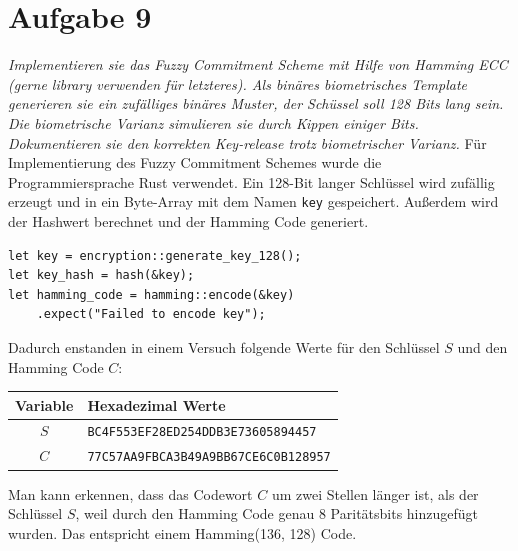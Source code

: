 \documentclass{article}
\begin{document}
    \section{Aufgabe 9}
    \textit{Implementieren sie das Fuzzy Commitment Scheme mit Hilfe von Hamming ECC
    (gerne library verwenden für letzteres). Als binäres biometrisches Template generieren 
    sie ein zufälliges binäres Muster, der Schüssel soll 128 Bits lang sein. Die
    biometrische Varianz simulieren sie durch Kippen einiger Bits. Dokumentieren sie
    den korrekten Key-release trotz biometrischer Varianz.}\vspace*{1em}\newline
    Für Implementierung des Fuzzy Commitment Schemes wurde die Programmiersprache Rust verwendet. Ein 128-Bit langer
    Schlüssel wird zufällig erzeugt und in ein Byte-Array mit dem Namen \verb|key| gespeichert. Außerdem wird 
    der Hashwert berechnet und der Hamming Code generiert.
    \begin{verbatim}
let key = encryption::generate_key_128();
let key_hash = hash(&key);    
let hamming_code = hamming::encode(&key)
    .expect("Failed to encode key");
    \end{verbatim}
    Dadurch enstanden in einem Versuch folgende Werte für den Schlüssel $S$ und den Hamming Code $C$:
    \begin{center}
        \begin{tabular}{cl}
            Variable & Hexadezimal Werte\\\hline
            $S$ & \verb|BC4F553EF28ED254DDB3E73605894457|\\
            $C$ & \verb|77C57AA9FBCA3B49A9BB67CE6C0B128957|
        \end{tabular}        
    \end{center}
    Man kann erkennen, dass das Codewort $C$ um zwei Stellen länger ist, als der Schlüssel $S$, weil durch den 
    Hamming Code genau 8 Paritätsbits hinzugefügt wurden. Das entspricht einem Hamming(136, 128) Code. 
    
\end{document}
